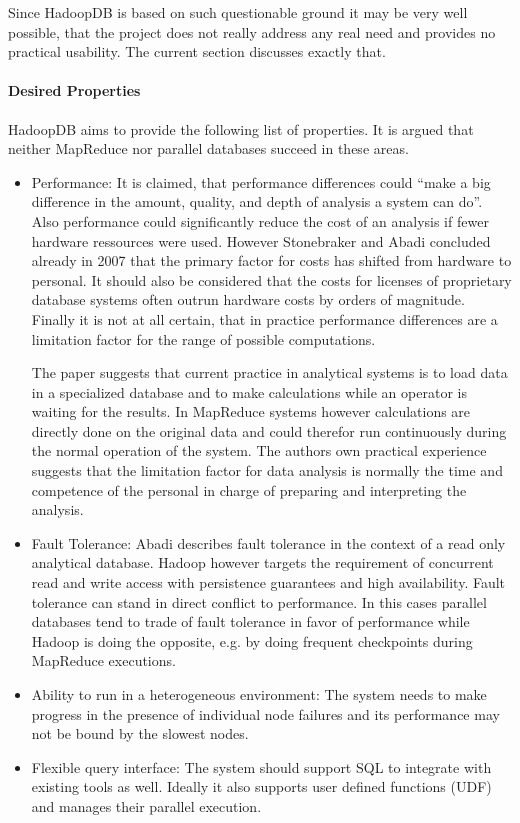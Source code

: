 \documentclass[12pt,a4paper]{scrartcl}		%
\begin{document}
Since HadoopDB is based on such questionable ground it may be very well possible, that the project does not really address any real need and provides no practical usability. The current section discusses exactly that.

\paragraph{Desired Properties}
HadoopDB aims to provide the following list of properties. It is argued that neither MapReduce nor parallel databases succeed in these areas.

\begin{itemize}
\item Performance: It is claimed, that performance differences could ``make a big difference in the amount, quality, and depth of analysis a system can do''. Also performance could significantly reduce the cost of an analysis if fewer hardware ressources were used. However Stonebraker and Abadi concluded already in 2007 that the primary factor for costs has shifted from hardware to personal.\cite[2.5 No Knobs]{sto07} It should also be considered that the costs for licenses of proprietary database systems often outrun hardware costs by orders of magnitude. Finally it is not at all certain, that in practice performance differences are a limitation factor for the range of possible computations.

The paper suggests that current practice in analytical systems is to load data in a specialized database and to make calculations while an operator is waiting for the results. In MapReduce systems however calculations are directly done on the original data and could therefor run continuously during the normal operation of the system.
The authors own practical experience suggests that the limitation factor for data analysis is normally the time and competence of the personal in charge of preparing and interpreting the analysis.
\item Fault Tolerance: Abadi describes fault tolerance in the context of a read only analytical database. Hadoop however targets the requirement of concurrent read and write access with persistence guarantees and high availability. Fault tolerance can stand in direct conflict to performance. In this cases parallel databases tend to trade of fault tolerance in favor of performance while Hadoop is doing the opposite, e.g. by doing frequent checkpoints during MapReduce executions.
\item Ability to run in a heterogeneous environment: The system needs to make progress in the presence of individual node failures and its performance may not be bound by the slowest nodes.
\item Flexible query interface: The system should support SQL to integrate with existing tools as well. Ideally it also supports user defined functions (UDF) and manages their parallel execution.
\end{itemize}
\end{document}
